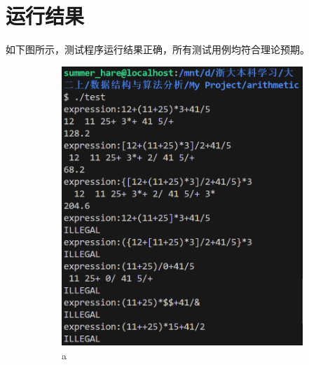 \documentclass[UTF8]{ctexart}
\begin{document}
\section{运行结果}
如下图所示，测试程序运行结果正确，所有测试用例均符合理论预期。
\begin{figure}[H]
    \centering
    \begin{subfigure}[b]{0.5\textwidth}
        \centering
        \includegraphics[width=\textwidth]{result1.png}
        \caption{a}
        \label{fig:result1}
    \end{subfigure}
    \hfill
    \begin{subfigure}[b]{0.4\textwidth}
        \centering

\end{subfigure}
\end{figure}
\end{document}
